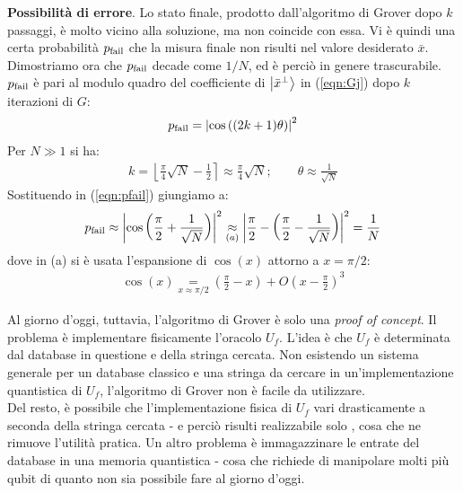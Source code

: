 \documentclass[../../InformazioneQuantistica.tex]{subfiles}
\begin{document}
\begin{expl}\textbf{Possibilità di errore}. Lo stato finale, prodotto dall'algoritmo di Grover dopo $k$ passaggi, è molto vicino alla soluzione, ma non coincide con essa. Vi è quindi una certa probabilità $p_{\operatorname{fail}}$ che la misura finale non risulti nel valore desiderato $\bar{x}$. Dimostriamo ora che $p_{\operatorname{fail}}$ decade come $1/N$, ed è perciò in genere trascurabile.\\
$p_{\operatorname{fail}}$ è pari al modulo quadro del coefficiente di $\Ket{\bar{x}^\perp}$ in (\ref{eqn:Gj}) dopo $k$ iterazioni di $G$:
\begin{align}
    p_{\operatorname{fail}} = \left|\cos \left( (2k+1)\theta \right) \right|^2 
    \label{eqn:pfail}
\end{align}
Per $N\gg 1$ si ha:
\begin{align*}
    k = \left \lfloor \frac{\pi}{4}\sqrt{N} - \frac{1}{2}\right \rceil \approx \frac{\pi}{4}\sqrt{N}; \qquad \theta \approx \frac{1}{\sqrt{N}}
\end{align*}
Sostituendo in (\ref{eqn:pfail}) giungiamo a:
\begin{align*}
    p_{\operatorname{fail}} \approx \left | \cos \left( \frac{\pi}{2} + \frac{1}{\sqrt{N}} \right) \right|^2 \underset{(a)}{\approx} \left|\frac{\pi}{2}- \left(\frac{\pi}{2}-\frac{1}{\sqrt{N}}\right) \right|^2 = \frac{1}{N}
\end{align*}
dove in (a) si è usata l'espansione di $\cos(x)$ attorno a $x=\pi/2$:
\begin{align*}
    \cos(x) \underset{x\approx \pi/2}{=} \left( \frac{\pi}{2}-x\right) + O\left(x - \frac{\pi}{2}\right)^3
\end{align*}
\end{expl}

Al giorno d'oggi, tuttavia, l'algoritmo di Grover è solo una \textit{proof of concept}. Il problema è implementare fisicamente l'oracolo $U_f$. L'idea è che $U_f$ è determinata dal database in questione e della stringa cercata. Non esistendo un sistema generale per  un database classico e una stringa da cercare in un'implementazione quantistica di $U_f$, l'algoritmo di Grover non è facile da utilizzare.\\
Del resto, è possibile che l'implementazione fisica di $U_f$ vari drasticamente a seconda della stringa cercata - e perciò risulti realizzabile solo , cosa che ne rimuove l'utilità pratica. Un altro problema è immagazzinare le entrate del database in una memoria quantistica - cosa che richiede di manipolare molti più qubit di quanto non sia possibile fare al giorno d'oggi.
\end{document}
